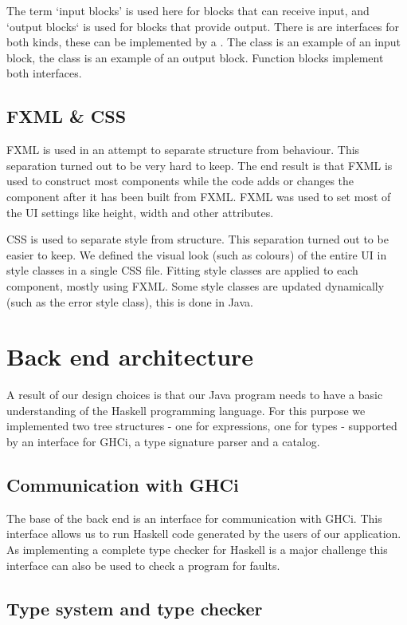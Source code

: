 The term `input blocks' is used here for blocks that can receive input, and `output blocks` is used for blocks that provide output. There is are interfaces for both kinds, these can be implemented by a . The  class is an example of an input block, the  class is an example of an output block. Function blocks implement both interfaces.

\subsection{FXML \& CSS}
FXML is used in an attempt to separate structure from behaviour. This separation turned out to be very hard to keep. The end result is that FXML is used to construct most components while the code adds or changes the component after it has been built from FXML. FXML was used to set most of the UI settings like height, width and other attributes.

CSS is used to separate style from structure. This separation turned out to be easier to keep. We defined the visual look (such as colours) of the entire UI in style classes in a single CSS file. Fitting style classes are applied to each component, mostly using FXML. Some style classes are updated dynamically (such as the error style class), this is done in Java.

\section{Back end architecture}

A result of our design choices is that our Java program needs to have a basic understanding of the Haskell programming
language. For this purpose we implemented two tree structures - one for expressions, one for types - supported by an
interface for GHCi, a type signature parser and a catalog.

\subsection{Communication with GHCi}
\label{GHCi}

The base of the back end is an interface for communication with GHCi. This interface allows us to run Haskell code
generated by the users of our application. As implementing a complete type checker for Haskell is a major challenge this
interface can also be used to check a program for faults.

\subsection{Type system and type checker}

